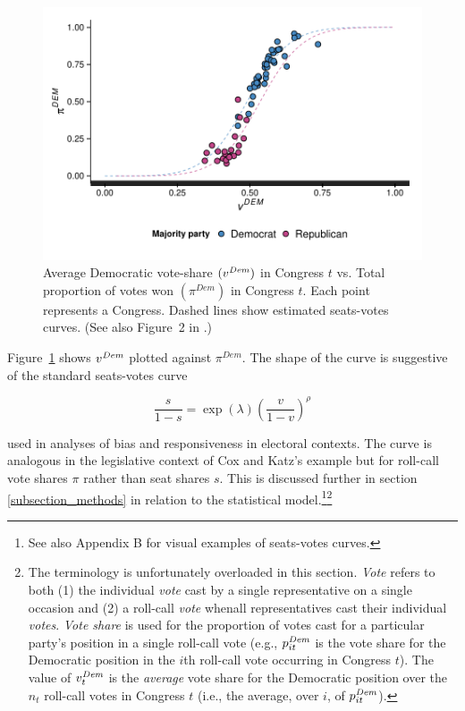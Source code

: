 \begin{figure}
\centering
	\includegraphics[scale=0.75]{sections/figs/vdem_vs_pdem}
\caption{Average Democratic vote-share $(v^{\it Dem})$ in Congress $t$ vs. Total proportion of 
votes won $(\pi^{Dem})$ in Congress $t$. Each point represents a Congress. Dashed lines show 
estimated seats-votes curves. (See also Figure~2 in \protect{}.)}
\label{fig:log_vratio_vs_ptdem}
\end{figure}


Figure~\ref{fig:log_vratio_vs_ptdem} shows $v^{\it Dem}$ plotted against $\pi^{Dem}$. 
The shape of the curve is suggestive of the standard seats-votes curve  

\begin{equation*}
 \frac{s}{1-s} = \exp{(\lambda)}\left(\frac{v}{1-v}\right)^\rho 
\end{equation*}

\noindent used in analyses of bias and responsiveness in electoral contexts. The curve is 
analogous in the legislative context of Cox and Katz's example but for roll-call vote shares 
$\pi$ rather than seat shares $s$. This is discussed further in section \ref{subsection_methods}
in relation to the statistical model.\footnote{See also Appendix B %
for visual examples of seats-votes curves.}\footnote{The terminology is unfortunately overloaded in this 
section. {\it Vote} refers to both (1) the individual {\it vote} cast by a single representative on a 
single occasion and (2) a roll-call {\it vote} whenall representatives cast their individual {\it votes}. 
{\it Vote share} is used for the proportion of votes cast for a particular party's position in a single 
roll-call vote (e.g., $p^{\it Dem}_{it}$ is the vote share for the Democratic position in the $i$th 
roll-call vote occurring in Congress $t$). The value of $v_t^{\it Dem}$ is the {\it average} vote 
share for the Democratic position over the $n_t$ roll-call votes in Congress $t$ (i.e., the average, 
over $i$, of $p^{\it Dem}_{it}$). }  

